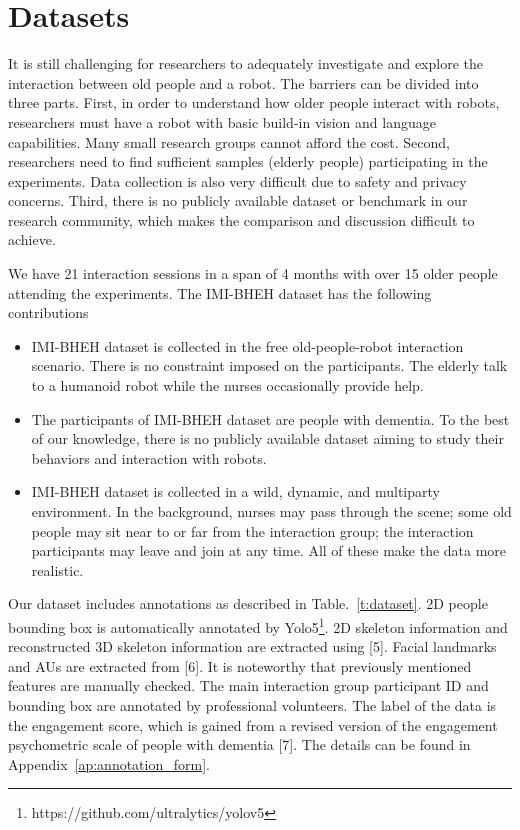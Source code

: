 \documentclass[10pt,journal,compsoc]{IEEEtran}
\begin{document}
\section{Datasets}
\label{s:Datasets}

It is still challenging for researchers to adequately investigate and explore the interaction between old people and a robot. The barriers can be divided into three parts. First, in order to understand how older people interact with robots, researchers must have a robot with basic build-in vision and language capabilities. Many small research groups cannot afford the cost. Second, researchers need to find sufficient samples (elderly people) participating in the experiments. Data collection is also very difficult due to safety and privacy concerns. Third, there is no publicly available dataset or benchmark in our research community, which makes the comparison and discussion difficult to achieve.

We have 21 interaction sessions in a span of 4 months with over 15 older people attending the experiments. The IMI-BHEH dataset has the following contributions
\begin{itemize}
  \item IMI-BHEH dataset is collected in the free old-people-robot interaction scenario. There is no constraint imposed on the participants. The elderly talk to a humanoid robot while the nurses occasionally provide help.
  \item The participants of IMI-BHEH dataset are people with dementia. To the best of our knowledge, there is no publicly available dataset aiming to study their behaviors and interaction with robots.
  \item IMI-BHEH dataset is collected in a wild, dynamic, and multiparty environment. In the background, nurses may pass through the scene; some old people may sit near to or far from the interaction group; the interaction participants may leave and join at any time. All of these make the data more realistic.
\end{itemize}

Our dataset includes annotations as described in Table.~\ref{t:dataset}. 2D people bounding box is automatically annotated by Yolo5\footnote{https://github.com/ultralytics/yolov5}. 2D skeleton information and reconstructed 3D skeleton information are extracted using [5]. Facial landmarks and AUs are extracted from [6]. It is noteworthy that previously mentioned features are manually checked. The main interaction group participant ID and bounding box are annotated by professional volunteers. The label of the data is the engagement score, which is gained from a revised version of the engagement psychometric scale of people with dementia [7]. The details can be found in Appendix~\ref{ap:annotation_form}.
\end{document}
